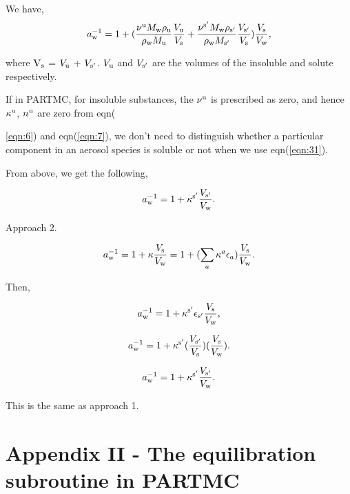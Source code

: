 \documentclass[12pt]{article}
\begin{document}
We have,
\begin{equation}\label{eqn:36}
a_{\rm w}^{-1}=1+ (  \frac{\nu^{\rm u} M_{\rm w} \rho_{\rm u}}{\rho_{\rm w}M_{\rm u}} 
\frac{V_{\rm u}}{V_{\rm s}} +
\frac{\nu^{\rm s'} M_{\rm w} \rho_{\rm s'}}{\rho_{\rm w} M_{\rm s'}}    
\frac{V_{\rm s'}}{V_{\rm s}})
\frac{V_{\rm s}}{V_{\rm w}},
\end{equation}

where $\rm V_{\rm s}$ = $ V_{\rm u}$ + $V_{\rm s'}$. $V_{\rm u}$ and $V_{\rm s'}$ are the volumes of the insoluble and solute respectively.

If in PARTMC, for insoluble substances, the $\nu^{\rm u}$ is prescribed as zero, and hence $\kappa^{\rm u}$, $n^{\rm u}$  are zero from eqn({\ref{eqn:6}) and eqn(\ref{eqn:7}), we don't need to distinguish whether a particular component in an aerosol species is soluble or not when we use eqn(\ref{eqn:31}).

From above, we get the following,

\begin{equation}\label{eqn:37}
a_{\rm w}^{-1}=1+ \kappa^{\rm s'} \frac{V_{\rm s'}}{V_{\rm w}}.
\end{equation}

Approach 2.

\begin{equation}\label{eqn:38}
a_{\rm w}^{-1}=1+\kappa \frac{V_{\rm s}}{V_{\rm w}}=1+ (\sum_{a} \kappa^{a} \epsilon_{a})\frac{V_{\rm s}}{V_{\rm w}}.
\end{equation}

Then,

\begin{equation}\label{eqn:39}
a_{\rm w}^{-1}=1+ \kappa^{\rm s'} \epsilon_{\rm s'} \frac{V_{\rm s}}{V_{\rm w}},
\end{equation}

\begin{equation}\label{eqn:40}
a_{\rm w}^{-1}=1+ \kappa^{\rm s'} (\frac{V_{\rm s'}}{V_{\rm s}})(\frac{V_{\rm s}}{V_{\rm w}}).
\end{equation}

\begin{equation}\label{eqn:37}
a_{\rm w}^{-1}=1+ \kappa^{\rm s'} \frac{V_{\rm s'}}{V_{\rm w}}.
\end{equation}

This is the same as approach 1. 


\section{Appendix II - The equilibration subroutine in PARTMC}

}
\end{document}

